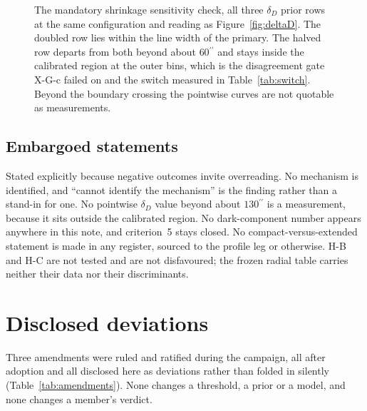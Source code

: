 \documentclass[11pt]{article}
\newcommand{\as}{\ensuremath{^{\prime\prime}}}
\newcommand{\dD}{\ensuremath{\delta_D}}
\begin{document}
\begin{figure}[htbp]
\caption{The mandatory shrinkage sensitivity check, all three \dD{} prior rows at the same configuration and reading as Figure~\ref{fig:deltaD}. The doubled row lies within the line width of the primary. The halved row departs from both beyond about $60\as$ and stays inside the calibrated region at the outer bins, which is the disagreement gate X-G-c failed on and the switch measured in Table~\ref{tab:switch}. Beyond the boundary crossing the pointwise curves are not quotable as measurements.}
\label{fig:shrinkage}
\end{figure}

\subsection{Embargoed statements}
\label{sec:notquotable}

Stated explicitly because negative outcomes invite overreading. No mechanism is identified, and ``cannot identify the mechanism'' is the finding rather than a stand-in for one. No pointwise \dD{} value beyond about $130\as$ is a measurement, because it sits outside the calibrated region. No dark-component number appears anywhere in this note, and criterion~5 stays closed. No compact-versus-extended statement is made in any register, sourced to the profile leg or otherwise. H-B and H-C are not tested and are not disfavoured; the frozen radial table carries neither their data nor their discriminants.

\section{Disclosed deviations}
\label{sec:deviations}

Three amendments were ruled and ratified during the campaign, all after adoption and all disclosed here as deviations rather than folded in silently (Table~\ref{tab:amendments}). None changes a threshold, a prior or a model, and none changes a member's verdict.
\end{document}
